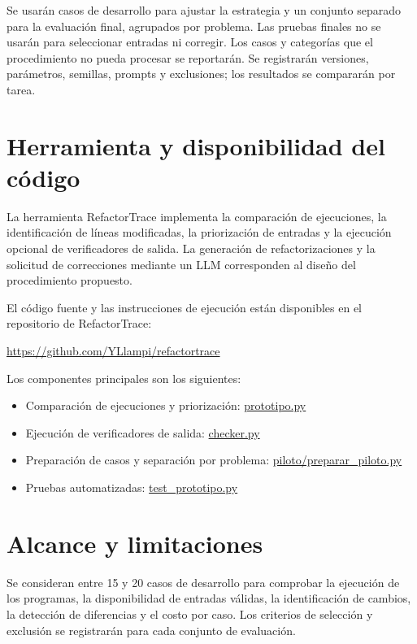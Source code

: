 \documentclass[11pt,openright,final]{unsa}
\begin{document}
Se usarán casos de desarrollo para ajustar la estrategia y un conjunto separado para la evaluación final, agrupados por problema. Las pruebas finales no se usarán para seleccionar entradas ni corregir. Los casos y categorías que el procedimiento no pueda procesar se reportarán. Se registrarán versiones, parámetros, semillas, prompts y exclusiones; los resultados se compararán por tarea.



\section{Herramienta y disponibilidad del código}

La herramienta RefactorTrace implementa la comparación de ejecuciones, la identificación de líneas modificadas, la priorización de entradas y la ejecución opcional de verificadores de salida. La generación de refactorizaciones y la solicitud de correcciones mediante un LLM corresponden al diseño del procedimiento propuesto.

El código fuente y las instrucciones de ejecución están disponibles en el repositorio de RefactorTrace:

\url{https://github.com/YLlampi/refactortrace}

Los componentes principales son los siguientes:

\begin{itemize}
\item Comparación de ejecuciones y priorización: \href{https://github.com/YLlampi/refactortrace/blob/main/prototipo.py}{prototipo.py}
\item Ejecución de verificadores de salida: \href{https://github.com/YLlampi/refactortrace/blob/main/checker.py}{checker.py}
\item Preparación de casos y separación por problema: \href{https://github.com/YLlampi/refactortrace/blob/main/piloto/preparar_piloto.py}{piloto/preparar\_piloto.py}
\item Pruebas automatizadas: \href{https://github.com/YLlampi/refactortrace/blob/main/test_prototipo.py}{test\_prototipo.py}
\end{itemize}

\section{Alcance y limitaciones}

Se consideran entre 15 y 20 casos de desarrollo para comprobar la ejecución de los programas, la disponibilidad de entradas válidas, la identificación de cambios, la detección de diferencias y el costo por caso. Los criterios de selección y exclusión se registrarán para cada conjunto de evaluación.
\end{document}
